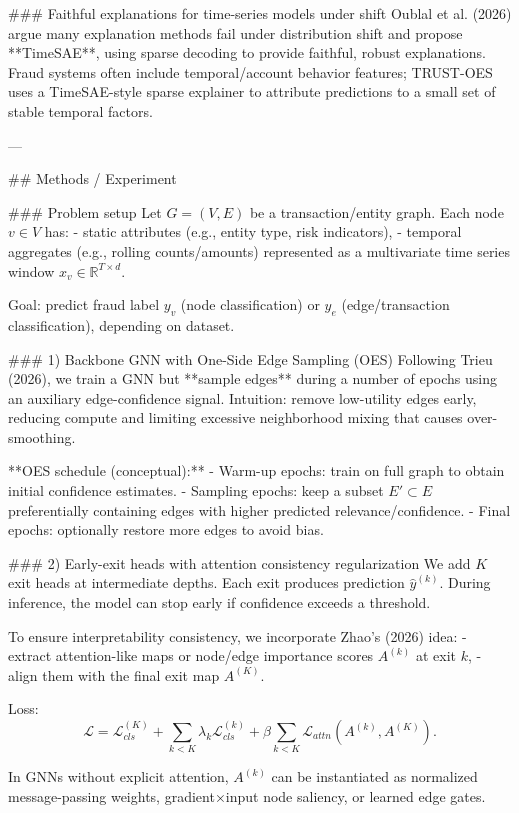 ### Faithful explanations for time-series models under shift  
Oublal et al. (2026) argue many explanation methods fail under distribution shift and propose **TimeSAE**, using sparse decoding to provide faithful, robust explanations. Fraud systems often include temporal/account behavior features; TRUST-OES uses a TimeSAE-style sparse explainer to attribute predictions to a small set of stable temporal factors.

---

## Methods / Experiment  

### Problem setup  
Let \(G=(V,E)\) be a transaction/entity graph. Each node \(v\in V\) has:
- static attributes (e.g., entity type, risk indicators),
- temporal aggregates (e.g., rolling counts/amounts) represented as a multivariate time series window \(x_v \in \mathbb{R}^{T\times d}\).

Goal: predict fraud label \(y_v\) (node classification) or \(y_e\) (edge/transaction classification), depending on dataset.

### 1) Backbone GNN with One-Side Edge Sampling (OES)  
Following Trieu (2026), we train a GNN but **sample edges** during a number of epochs using an auxiliary edge-confidence signal. Intuition: remove low-utility edges early, reducing compute and limiting excessive neighborhood mixing that causes over-smoothing.

**OES schedule (conceptual):**
- Warm-up epochs: train on full graph to obtain initial confidence estimates.
- Sampling epochs: keep a subset \(E'\subset E\) preferentially containing edges with higher predicted relevance/confidence.
- Final epochs: optionally restore more edges to avoid bias.

### 2) Early-exit heads with attention consistency regularization  
We add \(K\) exit heads at intermediate depths. Each exit produces prediction \(\hat{y}^{(k)}\). During inference, the model can stop early if confidence exceeds a threshold.

To ensure interpretability consistency, we incorporate Zhao’s (2026) idea:
- extract attention-like maps or node/edge importance scores \(A^{(k)}\) at exit \(k\),
- align them with the final exit map \(A^{(K)}\).

Loss:
\[
\mathcal{L}=\mathcal{L}_{cls}^{(K)}+\sum_{k < K}\lambda_k \mathcal{L}_{cls}^{(k)}+\beta\sum_{k < K}\mathcal{L}_{attn}(A^{(k)},A^{(K)}).
\]

In GNNs without explicit attention, \(A^{(k)}\) can be instantiated as normalized message-passing weights, gradient×input node saliency, or learned edge gates.

